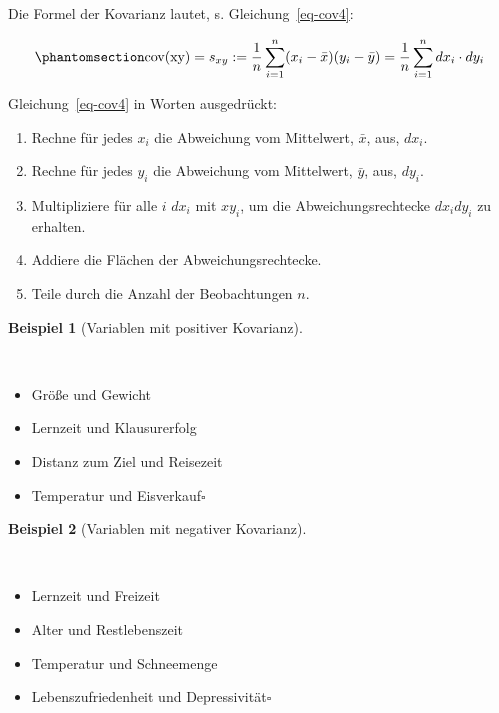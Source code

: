 \documentclass[
  letterpaper,
]{scrbook}
\providecommand{\tightlist}{%
  \setlength{\itemsep}{0pt}\setlength{\parskip}{0pt}}\usepackage{longtable,booktabs,array}
\theoremstyle{definition}
\newtheorem{example}{Beispiel}[chapter]
\theoremstyle{definition}
\theoremstyle{definition}
\theoremstyle{remark}
\begin{document}
Die Formel der Kovarianz lautet, s. Gleichung~\ref{eq-cov4}:

\begin{equation}\phantomsection\label{eq-cov4}{\text{cov(xy)} = s_{xy}:=\frac{1}{n}\sum_{i=1}^n (x_i-\bar{x})(y_i-\bar{y}) = \frac{1}{n}\sum_{i=1}^n dx_i\cdot dy_i}\end{equation}

Gleichung~\ref{eq-cov4} in Worten ausgedrückt:

\begin{enumerate}
\def\labelenumi{\arabic{enumi}.}
\tightlist
\item
  Rechne für jedes \(x_i\) die Abweichung vom Mittelwert, \(\bar{x}\),
  aus, \(dx_i\).
\item
  Rechne für jedes \(y_i\) die Abweichung vom Mittelwert, \(\bar{y}\),
  aus, \(dy_i\).
\item
  Multipliziere für alle \(i\) \(dx_i\) mit \(xy_i\), um die
  Abweichungsrechtecke \(dx_i dy_i\) zu erhalten.
\item
  Addiere die Flächen der Abweichungsrechtecke.
\item
  Teile durch die Anzahl der Beobachtungen \(n\).
\end{enumerate}

\begin{example}[Variablen mit positiver
Kovarianz]\protect\hypertarget{exm-pos-kov}{}\label{exm-pos-kov}

~

\begin{itemize}
\tightlist
\item
  Größe und Gewicht
\item
  Lernzeit und Klausurerfolg
\item
  Distanz zum Ziel und Reisezeit
\item
  Temperatur und Eisverkauf\(\square\)
\end{itemize}

\end{example}

\begin{example}[Variablen mit negativer
Kovarianz]\protect\hypertarget{exm-neg-kov}{}\label{exm-neg-kov}

~

\begin{itemize}
\tightlist
\item
  Lernzeit und Freizeit
\item
  Alter und Restlebenszeit
\item
  Temperatur und Schneemenge
\item
  Lebenszufriedenheit und Depressivität\(\square\)
\end{itemize}

\end{example}
\end{document}
